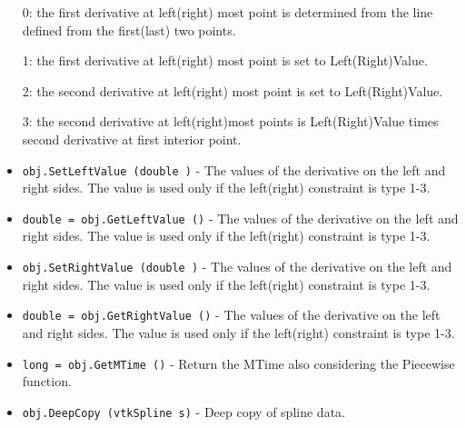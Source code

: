 \begin{itemize}
 0: the first derivative at left(right) most point is determined
 from the line defined from the first(last) two points.

 1: the first derivative at left(right) most point is set to
 Left(Right)Value.
 
 2: the second derivative at left(right) most point is set to
 Left(Right)Value.
 
 3: the second derivative at left(right)most points is Left(Right)Value
 times second derivative at first interior point.

\item  \verb|obj.SetLeftValue (double )| -  The values of the derivative on the left and right sides. The value
 is used only if the left(right) constraint is type 1-3.

\item  \verb|double = obj.GetLeftValue ()| -  The values of the derivative on the left and right sides. The value
 is used only if the left(right) constraint is type 1-3.

\item  \verb|obj.SetRightValue (double )| -  The values of the derivative on the left and right sides. The value
 is used only if the left(right) constraint is type 1-3.

\item  \verb|double = obj.GetRightValue ()| -  The values of the derivative on the left and right sides. The value
 is used only if the left(right) constraint is type 1-3.

\item  \verb|long = obj.GetMTime ()| -  Return the MTime also considering the Piecewise function.

\item  \verb|obj.DeepCopy (vtkSpline s)| -  Deep copy of spline data.

\end{itemize}
